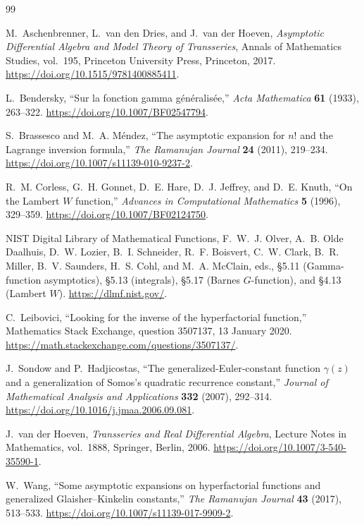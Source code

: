 \documentclass[11pt,oneside]{article}
\theoremstyle{plain}
\theoremstyle{definition}
\theoremstyle{remark}
\begin{document}
\begin{thebibliography}{99}

M.~Aschenbrenner, L.~van den Dries, and J.~van der Hoeven,
\emph{Asymptotic Differential Algebra and Model Theory of Transseries},
Annals of Mathematics Studies, vol.~195, Princeton University Press,
Princeton, 2017.
\newblock \url{https://doi.org/10.1515/9781400885411}.

L.~Bendersky,
``Sur la fonction gamma g\'en\'eralis\'ee,''
\emph{Acta Mathematica} \textbf{61} (1933), 263--322.
\newblock \url{https://doi.org/10.1007/BF02547794}.

S.~Brassesco and M.~A. M\'endez,
``The asymptotic expansion for \(n!\) and the Lagrange inversion formula,''
\emph{The Ramanujan Journal} \textbf{24} (2011), 219--234.
\newblock \url{https://doi.org/10.1007/s11139-010-9237-2}.

R.~M. Corless, G.~H. Gonnet, D.~E. Hare, D.~J. Jeffrey, and D.~E. Knuth,
``On the Lambert \(W\) function,''
\emph{Advances in Computational Mathematics} \textbf{5} (1996), 329--359.
\newblock \url{https://doi.org/10.1007/BF02124750}.

NIST Digital Library of Mathematical Functions,
F.~W.~J. Olver, A.~B. Olde Daalhuis, D.~W. Lozier, B.~I. Schneider,
R.~F. Boisvert, C.~W. Clark, B.~R. Miller, B.~V. Saunders,
H.~S. Cohl, and M.~A. McClain, eds.,
\S5.11 (Gamma-function asymptotics), \S5.13 (integrals),
\S5.17 (Barnes \(G\)-function), and \S4.13 (Lambert \(W\)).
\newblock \url{https://dlmf.nist.gov/}.

C.~Leibovici,
``Looking for the inverse of the hyperfactorial function,''
Mathematics Stack Exchange, question 3507137, 13 January 2020.
\newblock \url{https://math.stackexchange.com/questions/3507137/}.

J.~Sondow and P.~Hadjicostas,
``The generalized-Euler-constant function \(\gamma(z)\) and a generalization
of Somos's quadratic recurrence constant,''
\emph{Journal of Mathematical Analysis and Applications}
\textbf{332} (2007), 292--314.
\newblock \url{https://doi.org/10.1016/j.jmaa.2006.09.081}.

J.~van der Hoeven,
\emph{Transseries and Real Differential Algebra},
Lecture Notes in Mathematics, vol.~1888, Springer, Berlin, 2006.
\newblock \url{https://doi.org/10.1007/3-540-35590-1}.

W.~Wang,
``Some asymptotic expansions on hyperfactorial functions and generalized
Glaisher--Kinkelin constants,''
\emph{The Ramanujan Journal} \textbf{43} (2017), 513--533.
\newblock \url{https://doi.org/10.1007/s11139-017-9909-2}.


\end{thebibliography}
\end{document}
